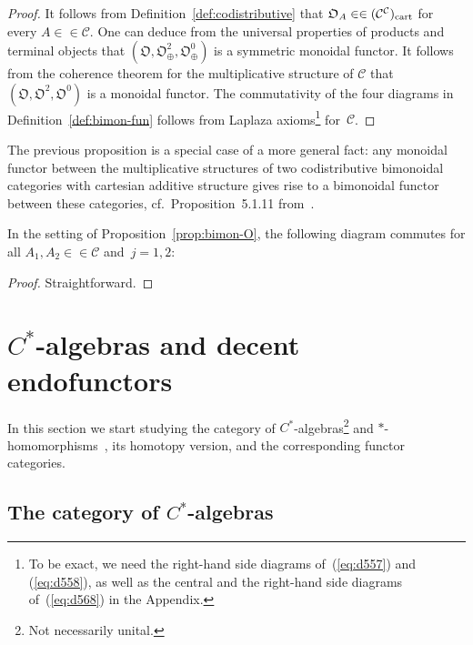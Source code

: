 \documentclass[10pt]{simplearticle}
\newcommand{\tikzinput}[1]{}
\newcommand{\bpp}[1]{(#1^{#1})_{\textup{cart}}}
\begin{document}
\begin{proof}
It follows from Definition~\ref{def:codistributive} that $\mathfrak{O}_{A}\in\in\bpp{\mathcal{C}}$
for every $A\in\in\mathcal{C}$. One can deduce from the universal
properties of products and terminal objects that $(\mathfrak{O},\mathfrak{O}^{2}_{\oplus},\mathfrak{O}^{0}_{\oplus})$
is a symmetric monoidal functor. It follows from the coherence theorem
for the multiplicative structure of $\mathcal{C}$ that $(\mathfrak{O},\mathfrak{O}^{2},\mathfrak{O}^{0})$
is a monoidal functor. The commutativity of the four diagrams in Definition~\ref{def:bimon-fun}
follows from Laplaza axioms\footnote{To be exact, we need the right-hand side diagrams of~(\ref{eq:d557})
and (\ref{eq:d558}), as well as the central and the right-hand side
diagrams of~(\ref{eq:d568}) in the Appendix.} for~$\mathcal{C}$.
\end{proof}

\begin{rem}\label{rem:bimon-ext}
The
previous proposition is
a special case of a more general fact: any monoidal functor between
the multiplicative structures of two codistributive bimonoidal categories
with cartesian additive structure gives rise to a bimonoidal functor
between these categories, cf.~Proposition~5.1.11 from~\cite{JY_bimon24}.
\end{rem}

\begin{lem}\label{lem:218}
In the setting of Proposition~\ref{prop:bimon-O},
the following diagram commutes for all $A_{1},A_{2}\in\in\mathcal{C}$
and~$j=1,2$:
\[
\tikzinput{d369}
\]
\end{lem}

\begin{proof}
Straightforward.
\end{proof}
\section{$C^{*}$-algebras and decent endofunctors}

In this section we start studying the
category of
$C^{*}$-algebras\footnote{Not necessarily unital.} and $*$-homomorphisms~\cite{murphy1990},
its homotopy version, and the corresponding functor categories.

\subsection{\label{subsec:cal}The category of $C^{*}$-algebras}
\end{document}
